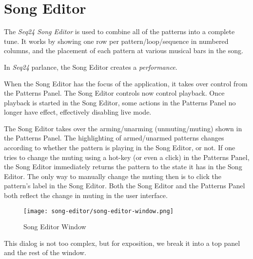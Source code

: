 %
%
%

\section{Song Editor}
\label{sec:seq24_song_editor}

   The \textsl{Seq24 Song Editor} is used to combine all of the patterns
   into a complete tune.  It works by showing one row per
   pattern/loop/sequence in numbered columns, and the placement of each
   pattern at various musical bars in the song.

   In \textsl{Seq24} parlance, the Song Editor creates a
   \textsl{performance}.

   When the Song Editor has the
   focus of the application, it takes over control from the Patterns Panel.
   The Song Editor controls now control playback.  Once playback is
   started in the Song Editor, some actions in the Patterns Panel no longer
   have effect, effectively disabling live mode.

   The Song Editor takes over the arming/unarming (unmuting/muting)
   shown in the Patterns Panel.  The highlighting of armed/unarmed patterns
   changes according to whether the pattern is playing in the Song Editor,
   or not.  If one tries to change the muting using a hot-key (or even a
   click) in the Patterns Panel, the Song Editor immediately returns the
   pattern to the state it has in the Song Editor.  The only way to manually
   change the muting then is to click the pattern's label in the Song
   Editor.  Both the Song Editor and the Patterns Panel both reflect the
   change in muting in the user interface.

\begin{figure}[H]
   \centering 
   \texttt{[image: song-editor/song-editor-window.png]}
   \caption{Song Editor Window}
   \label{fig:song_editor_window}
\end{figure}

   This dialog is not too complex, but
   for exposition, we break it into a top panel and the rest of the window.

